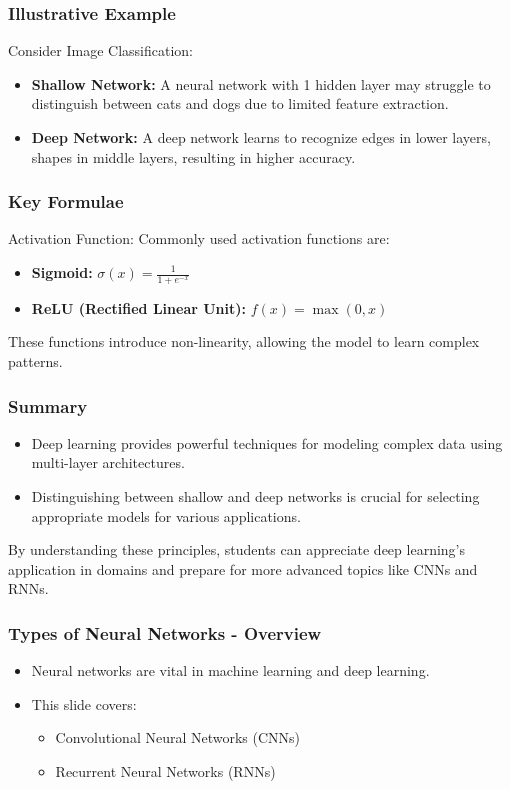 \documentclass[aspectratio=169]{beamer}
\begin{document}
\begin{frame}[fragile]
    \frametitle{Illustrative Example}
    \begin{block}{Consider Image Classification:}
        \begin{itemize}
            \item \textbf{Shallow Network:} A neural network with 1 hidden layer may struggle to distinguish between cats and dogs due to limited feature extraction.
            \item \textbf{Deep Network:} A deep network learns to recognize edges in lower layers, shapes in middle layers, resulting in higher accuracy.
        \end{itemize}
    \end{block}
\end{frame}

\begin{frame}[fragile]
    \frametitle{Key Formulae}
    \begin{block}{Activation Function:}
        Commonly used activation functions are:
        \begin{itemize}
            \item \textbf{Sigmoid:} \( \sigma(x) = \frac{1}{1 + e^{-x}} \)
            \item \textbf{ReLU (Rectified Linear Unit):} \( f(x) = \max(0, x) \)
        \end{itemize}
        These functions introduce non-linearity, allowing the model to learn complex patterns.
    \end{block}
\end{frame}

\begin{frame}[fragile]
    \frametitle{Summary}
    \begin{itemize}
        \item Deep learning provides powerful techniques for modeling complex data using multi-layer architectures.
        \item Distinguishing between shallow and deep networks is crucial for selecting appropriate models for various applications.
    \end{itemize}
    By understanding these principles, students can appreciate deep learning's application in domains and prepare for more advanced topics like CNNs and RNNs.
\end{frame}

\begin{frame}[fragile]
    \frametitle{Types of Neural Networks - Overview}
    \begin{itemize}
        \item Neural networks are vital in machine learning and deep learning.
        \item This slide covers:
        \begin{itemize}
            \item Convolutional Neural Networks (CNNs)
            \item Recurrent Neural Networks (RNNs)
        \end{itemize}
    \end{itemize}
\end{frame}
\end{document}
